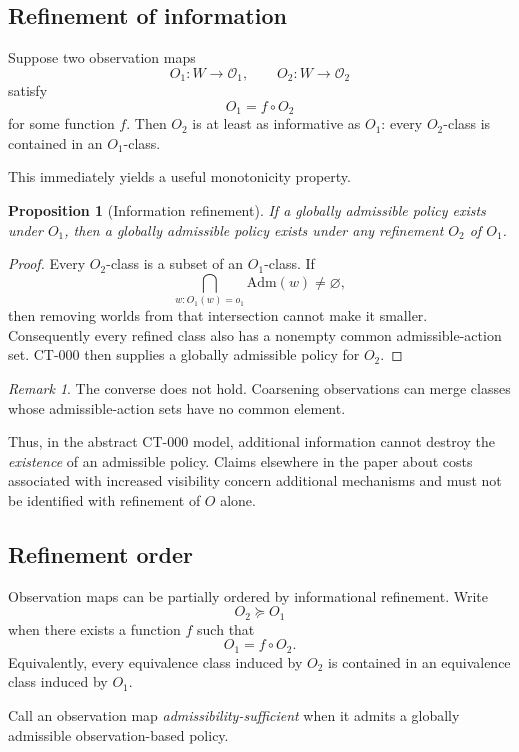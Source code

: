 \documentclass[11pt]{article}
\newtheorem{proposition}[theorem]{Proposition}
\theoremstyle{definition}
\theoremstyle{remark}
\newtheorem{remark}[theorem]{Remark}
\newcommand{\worlds}{W}
\newcommand{\obs}{\mathcal{O}}
\newcommand{\admissible}{\mathrm{Adm}}
\begin{document}
\subsection{Refinement of information}

Suppose two observation maps
\[
  O_1:\worlds\to\obs_1,
  \qquad
  O_2:\worlds\to\obs_2
\]
satisfy
\[
  O_1=f\circ O_2
\]
for some function $f$. Then $O_2$ is at least as informative as $O_1$:
every $O_2$-class is contained in an $O_1$-class.

This immediately yields a useful monotonicity property.

\begin{proposition}[Information refinement]
If a globally admissible policy exists under $O_1$, then a globally
admissible policy exists under any refinement $O_2$ of $O_1$.
\end{proposition}

\begin{proof}
Every $O_2$-class is a subset of an $O_1$-class. If
\[
  \bigcap_{w:O_1(w)=o_1}\admissible(w)
  \neq\varnothing,
\]
then removing worlds from that intersection cannot make it smaller.
Consequently every refined class also has a nonempty common admissible-action
set. CT-000 then supplies a globally admissible policy for $O_2$.
\end{proof}

\begin{remark}
The converse does not hold. Coarsening observations can merge classes whose
admissible-action sets have no common element.

Thus, in the abstract CT-000 model, additional information cannot destroy the
\emph{existence} of an admissible policy. Claims elsewhere in the paper about
costs associated with increased visibility concern additional mechanisms and
must not be identified with refinement of $O$ alone.
\end{remark}

\subsection{Refinement order}

Observation maps can be partially ordered by informational refinement. Write
\[
  O_2 \succeq O_1
\]
when there exists a function $f$ such that
\[
  O_1=f\circ O_2.
\]
Equivalently, every equivalence class induced by $O_2$ is contained in an
equivalence class induced by $O_1$.

Call an observation map \emph{admissibility-sufficient} when it admits a
globally admissible observation-based policy.
\end{document}
